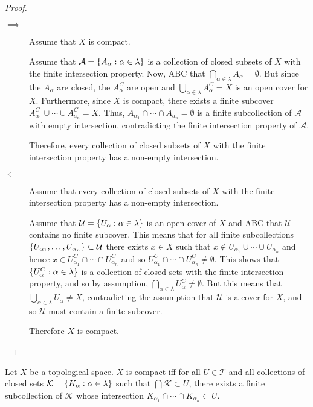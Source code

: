 \documentclass[letterpaper,12pt,fleqn]{article}
\newcommand{\U}{\mathcal{U}}
\renewcommand{\a}{\alpha}
\renewcommand{\l}{\lambda}
\newcommand{\A}{\mathcal{A}}
\newcommand{\T}{\mathscr{T}}
\newcommand{\K}{\mathcal{K}}
\begin{document}
\begin{proof}
  \begin{description}
  \item[]
  \item[\(\implies\)] Assume that \(X\) is compact.

    Assume that \(\A=\set{A_{\a}:\a\in\l}\) is a collection of closed subsets of \(X\) with the finite intersection
    property.  Now, ABC that \(\bigcap_{\a\in\l}A_{\a}=\emptyset\).  But since the \(A_{\a}\) are closed, the
    \(A_{\a}^C\) are open and \(\bigcup_{\a\in\l}A_{\a}^C=X\) is an open cover for \(X\).  Furthermore, since \(X\)
    is compact, there exists a finite subcover \(A_{\a_1}^C\cup\cdots\cup A_{a_n}^C=X\).  Thus,
    \(A_{\a_1}\cap\cdots\cap A_{a_n}=\emptyset\) is a finite subcollection of \(\A\) with empty intersection,
    contradicting the finite intersection property of \(\A\).

    Therefore, every collection of closed subsets of \(X\) with the finite intersection property has a non-empty
    intersection.

  \item[\(\impliedby\)] Assume that every collection of closed subsets of \(X\) with the finite intersection property
    has a non-empty intersection.

    Assume that \(\U=\set{U_{\a}:\a\in\l}\) is an open cover of \(X\) and ABC that \(\U\) contains no finite
    subcover.  This means that for all finite subcollections \(\set{U_{\a_1},\ldots,U_{\a_n}}\subset\U\) there
    exists \(x\in X\) such that \(x\notin U_{\a_1}\cup\cdots\cup U_{\a_n}\) and hence
    \(x\in U_{\a_1}^C\cap\cdots\cap U_{\a_n}^C\) and so \(U_{\a_1}^C\cap\cdots\cap U_{\a_n}^C\ne\emptyset\).  This shows
    that \(\set{U_{\a}^C:\a\in\l}\) is a collection of closed sets with the finite intersection property, and so by
    assumption, \(\bigcap_{\a\in\l}U_{\a}^C\ne\emptyset\).  But this means that \(\bigcup_{\a\in\l}U_{\a}\ne X\),
    contradicting the assumption that \(\U\) is a cover for \(X\), and so \(\U\) must contain a finite subcover.

    Therefore \(X\) is compact.
  \end{description}
\end{proof}

\begin{theorem}
  Let \(X\) be a topological space.  \(X\) is compact iff for all \(U\in\T\) and all collections of closed sets
  \(\K=\set{K_{\a}:\a\in\l}\) such that \(\bigcap\K\subset U\), there exists a finite subcollection of \(\K\)
  whose intersection \(K_{\a_1}\cap\cdots\cap K_{\a_n}\subset U\).
\end{theorem}
\end{document}
